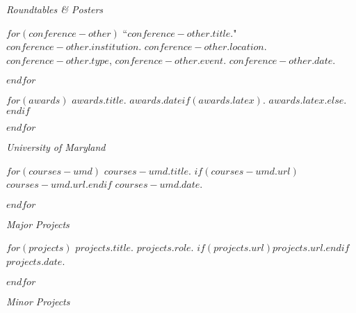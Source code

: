 \documentclass[11pt,article,oneside]{memoir}
\begin{document}
\pagebreak[1]
\ind \emph{Roundtables \& Posters}

\smallskip

$for(conference-other)$
\ind ``$conference-other.title$." $conference-other.institution$. $conference-other.location$. $conference-other.type$, \emph{$conference-other.event$}. $conference-other.date$. \normalsize

\smallskip
$endfor$

\bigskip
\pagebreak[1]


$for(awards)$
\ind $awards.title$. $awards.date$$if(awards.latex)$. $awards.latex$.$else${.}$endif$
\smallskip

$endfor$

\bigskip
\pagebreak[1]


\ind \emph{University of Maryland}

\smallskip

$for(courses-umd)$
\ind $courses-umd.title$. $if(courses-umd.url)$\href{$courses-umd.url$}{$courses-umd.url$}.$endif$ $courses-umd.date$.

$endfor$
\smallskip
\medskip

%
%
%

%
%
%
%


\ind \emph{Major Projects}

\smallskip

$for(projects)$
\ind \emph{$projects.title$}. $projects.role$. $if(projects.url)$\href{$projects.url$}{$projects.url$}.$endif$ $projects.date$.

\smallskip
$endfor$

\medskip

\ind \emph{Minor Projects}

\smallskip
\end{document}
